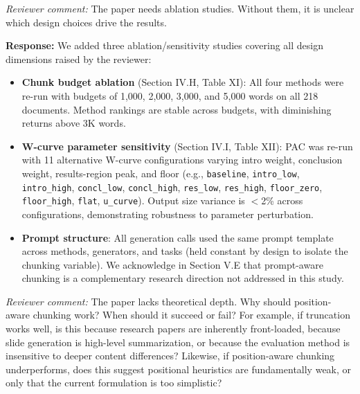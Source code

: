 \documentclass[11pt]{article}
\newcommand{\rcomment}[1]{\noindent\textcolor{revcomment}{\textit{Reviewer comment:}} #1\medskip}
\newcommand{\rresponse}[1]{\noindent\textcolor{response}{\textbf{Response:}} #1\medskip\medskip}
\begin{document}
\rcomment{The paper needs ablation studies. Without them, it is unclear which design choices drive the results.}

\rresponse{We added three ablation/sensitivity studies covering all design dimensions raised by the reviewer:
\begin{itemize}
    \item \textbf{Chunk budget ablation} (Section IV.H, Table XI): All four methods were re-run with budgets of 1{,}000, 2{,}000, 3{,}000, and 5{,}000 words on all 218 documents. Method rankings are stable across budgets, with diminishing returns above 3K words.
    \item \textbf{W-curve parameter sensitivity} (Section IV.I, Table XII): PAC was re-run with 11 alternative W-curve configurations varying intro weight, conclusion weight, results-region peak, and floor (e.g., \texttt{baseline}, \texttt{intro\_low}, \texttt{intro\_high}, \texttt{concl\_low}, \texttt{concl\_high}, \texttt{res\_low}, \texttt{res\_high}, \texttt{floor\_zero}, \texttt{floor\_high}, \texttt{flat}, \texttt{u\_curve}). Output size variance is $<$2\% across configurations, demonstrating robustness to parameter perturbation.
    \item \textbf{Prompt structure}: All generation calls used the same prompt template across methods, generators, and tasks (held constant by design to isolate the chunking variable). We acknowledge in Section V.E that prompt-aware chunking is a complementary research direction not addressed in this study.
\end{itemize}}

\rcomment{The paper lacks theoretical depth. Why should position-aware chunking work? When should it succeed or fail? For example, if truncation works well, is this because research papers are inherently front-loaded, because slide generation is high-level summarization, or because the evaluation method is insensitive to deeper content differences? Likewise, if position-aware chunking underperforms, does this suggest positional heuristics are fundamentally weak, or only that the current formulation is too simplistic?}
\end{document}
